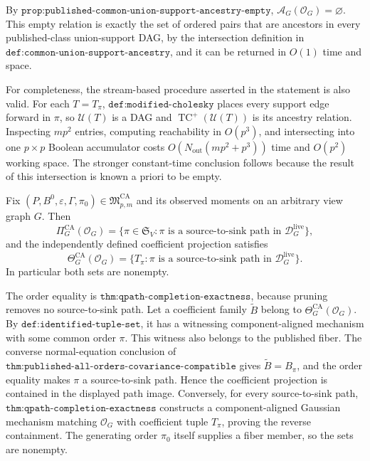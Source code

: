 By \(\texttt{prop:published-common-union-support-ancestry-empty}\), \(\mathcal A_G(\mathcal O_G)=\varnothing\).  This empty relation is exactly the set of ordered pairs that are ancestors in every published-class union-support DAG, by the intersection definition in \(\texttt{def:common-union-support-ancestry}\), and it can be returned in \(O(1)\) time and space.

For completeness, the stream-based procedure asserted in the statement is also valid.  For each \(T=T_\pi\), \(\texttt{def:modified-cholesky}\) places every support edge forward in \(\pi\), so \(\mathcal U(T)\) is a DAG and \(\operatorname{TC}^{+}(\mathcal U(T))\) is its ancestry relation.  Inspecting \(mp^2\) entries, computing reachability in \(O(p^3)\), and intersecting into one \(p\times p\) Boolean accumulator costs \(O(N_{\mathrm{out}}(mp^2+p^3))\) time and \(O(p^2)\) working space.  The stronger constant-time conclusion follows because the result of this intersection is known a priori to be empty.

Fix \((P,B^0,\varepsilon,\Gamma,\pi_0)\in\mathfrak M_{p,m}^{\mathrm{CA}}\) and its observed moments on an arbitrary view graph \(G\).  Then
\[
 \Pi_G^{\mathrm{CA}}(\mathcal O_G)
 =\{\pi\in\mathfrak S_V:\pi\text{ is a source-to-sink path in }
 \mathcal D_G^{\mathrm{live}}\},
\]
and the independently defined coefficient projection satisfies
\[
 \Theta_G^{\mathrm{CA}}(\mathcal O_G)
 =\{T_\pi:\pi\text{ is a source-to-sink path in }
 \mathcal D_G^{\mathrm{live}}\}.
\]
In particular both sets are nonempty.

The order equality is \(\texttt{thm:qpath-completion-exactness}\), because pruning removes no source-to-sink path.  Let a coefficient family \(\widetilde B\) belong to \(\Theta_G^{\mathrm{CA}}(\mathcal O_G)\).  By \(\texttt{def:identified-tuple-set}\), it has a witnessing component-aligned mechanism with some common order \(\pi\).  This witness also belongs to the published fiber.  The converse normal-equation conclusion of \(\texttt{thm:published-all-orders-covariance-compatible}\) gives \(\widetilde B=B_\pi\), and the order equality makes \(\pi\) a source-to-sink path.  Hence the coefficient projection is contained in the displayed path image.  Conversely, for every source-to-sink path, \(\texttt{thm:qpath-completion-exactness}\) constructs a component-aligned Gaussian mechanism matching \(\mathcal O_G\) with coefficient tuple \(T_\pi\), proving the reverse containment.  The generating order \(\pi_0\) itself supplies a fiber member, so the sets are nonempty.

